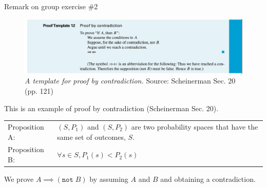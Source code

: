 \documentclass[10pt]{beamer}
\begin{document}
\begin{frame}{Remark on group exercise \#2}
\footnotesize  
\begin{figure}
\includegraphics[width=\textwidth]{images/proof_by_contradiction.png}
\caption{\textit{A template for proof by contradiction.} Source: Scheinerman Sec. 20 (pp. 121)}	
\end{figure}
%
\pause 
\vfill 
\begin{myredbox}[title=Remark]
 This is an example of proof by contradiction (Scheinerman Sec. 20).


\begin{table}
\centering 	
\begin{tabularx}{\textwidth}{XX}
Proposition A: 	& $(S,P_1)$  and $(S,P_2)$ are two probability spaces that have the same set of outcomes, $S$.  \\
Proposition B: & $\forall s \in S, P_1(s) < P_2(s)$
\end{tabularx}
\end{table}

 We prove $A \implies (\texttt{not} \; B)$ by assuming $A$ and $B$ and obtaining a contradiction.	
\end{myredbox}
\end{frame}
\end{document}
